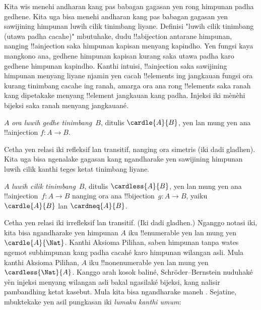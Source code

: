 \documentclass[../../../include/open-logic-section]{subfiles}
\begin{document}


\begin{explain}
Kita wis menehi andharan kang pas babagan gagasan yen rong himpunan
padha gedhene. Kita uga bisa menehi andharan kang pas babagan gagasan
yen sawijining himpunan luwih cilik tinimbang liyane. Definisi
"luwih cilik tinimbang (utawa padha cacahe)" mbutuhake,
dudu !!a{bijection} antarane himpunan, nanging !!a{injection}
saka himpunan kapisan menyang kapindho. Yen fungsi kaya mangkono ana,
gedhene himpunan kapisan kurang saka utawa padha karo gedhene himpunan
kapindho. Kanthi intuisi, !!a{injection} saka sawijining himpunan menyang
liyane njamin yen cacah !!{element}s ing jangkauan fungsi ora kurang
tinimbang cacahe ing ranah, amarga ora ana rong !!{element}s saka ranah
kang dipetakake menyang !!{element} jangkauan kang padha.
Injeksi iki mènèhi bijeksi saka ranah menyang jangkauané.
\end{explain}

\begin{defn}
$A$ \emph{ora luwih gedhe tinimbang}~$B$, ditulis $\cardle{A}{B}$,
yen lan mung yen ana !!a{injection} $f \colon A \to B$.
\end{defn}

Cetha yen relasi iki refleksif lan transitif, nanging ora simetris
(iki dadi gladhen). Kita uga bisa ngenalake gagasan kang
ngandharake yen sawijining himpunan luwih cilik kanthi teges ketat
tinimbang liyane.

\begin{defn}
$A$ \emph{luwih cilik tinimbang}~$B$, ditulis $\cardless{A}{B}$,
yen lan mung yen ana !!a{injection}~$f\colon A \to B$ nanging ora ana
!!{bijection}~$g\colon A \to B$, yaiku $\cardle{A}{B}$ lan $\cardneq{A}{B}$.
\end{defn}

Cetha yen relasi iki irrefleksif lan transitif.
(Iki dadi gladhen.) Nganggo notasi iki, kita bisa ngandharake
yen himpunan $A$ iku !!{enumerable} yen lan mung yen $\cardle{A}{\Nat}$.
Kanthi Aksioma Pilihan, saben himpunan tanpa wates ngemot subhimpunan kang
padha cacahé karo himpunan wilangan asli. Mula kanthi Aksioma Pilihan,
$A$ iku !!{nonenumerable} yen lan mung yen $\cardless{\Nat}{A}$.
Kanggo arah kosok baliné, Schr\"oder--Bernstein nuduhaké yèn injeksi
menyang wilangan asli bakal ngasilaké bijeksi, kang nalisir
pambandhing ketat kasebut.
Mula kita bisa ngandharake maneh
.
Sejatine, \citet{Cantor1892} mbuktekake yen asil pungkasan iki
\emph{lumaku kanthi umum}:
\end{document}
